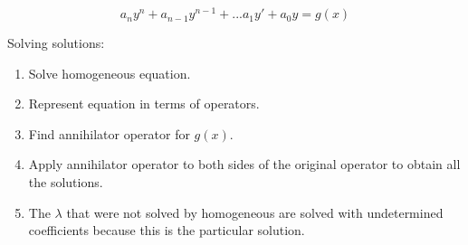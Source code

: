 \documentclass[letterpaper]{article}
\newcommand{\divline}{\noindent\makebox[\linewidth]{\rule{\textwidth}{0.4pt}}}
\begin{document}
    \begin{multicols}{2}

        \[a_{n}y^{n} + a_{n-1}y^{n-1} + ... a_{1}y' + a_{0}y = g(x)\]
        
        Solving solutions:
        \begin{enumerate}
            \item Solve homogeneous equation.
            \item Represent equation in terms of operators.
            \item Find annihilator operator for \(g(x)\).
            \item Apply annihilator operator to both sides of the original operator to obtain all the solutions.
            \item The \(\lambda\) that were not solved by homogeneous are solved with undetermined coefficients because this is the particular solution.
        \end{enumerate}
    \end{multicols}

    \divline
    
\end{document}
